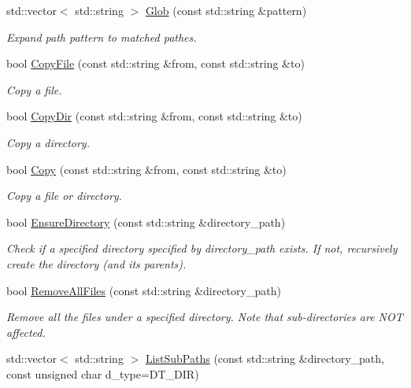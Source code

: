 \begin{DoxyCompactItemize}
std\-::vector$<$ std\-::string $>$ \hyperlink{namespaceapollo_1_1cyber_1_1common_a9641469fee4f575ee274054d5f3efd73}{Glob} (const std\-::string \&pattern)
\begin{DoxyCompactList}\small\item\em Expand path pattern to matched pathes. \end{DoxyCompactList}\item 
bool \hyperlink{namespaceapollo_1_1cyber_1_1common_a222bd281a29c75f00ed9e66a986ed674}{Copy\-File} (const std\-::string \&from, const std\-::string \&to)
\begin{DoxyCompactList}\small\item\em Copy a file. \end{DoxyCompactList}\item 
bool \hyperlink{namespaceapollo_1_1cyber_1_1common_a327d27353ef7e5d2f50c809c3b05648c}{Copy\-Dir} (const std\-::string \&from, const std\-::string \&to)
\begin{DoxyCompactList}\small\item\em Copy a directory. \end{DoxyCompactList}\item 
bool \hyperlink{namespaceapollo_1_1cyber_1_1common_a6eb038dc356389e7f1d1e6ab4932c4f0}{Copy} (const std\-::string \&from, const std\-::string \&to)
\begin{DoxyCompactList}\small\item\em Copy a file or directory. \end{DoxyCompactList}\item 
bool \hyperlink{namespaceapollo_1_1cyber_1_1common_ada31727aa6860a122a2f6876e84ae950}{Ensure\-Directory} (const std\-::string \&directory\-\_\-path)
\begin{DoxyCompactList}\small\item\em Check if a specified directory specified by directory\-\_\-path exists. If not, recursively create the directory (and its parents). \end{DoxyCompactList}\item 
bool \hyperlink{namespaceapollo_1_1cyber_1_1common_aa18872a33740ca001df7cf11bdf1d891}{Remove\-All\-Files} (const std\-::string \&directory\-\_\-path)
\begin{DoxyCompactList}\small\item\em Remove all the files under a specified directory. Note that sub-\/directories are N\-O\-T affected. \end{DoxyCompactList}\item 
std\-::vector$<$ std\-::string $>$ \hyperlink{namespaceapollo_1_1cyber_1_1common_a785184e21861f27284d8531610b550ae}{List\-Sub\-Paths} (const std\-::string \&directory\-\_\-path, const unsigned char d\-\_\-type=D\-T\-\_\-\-D\-I\-R)

\end{DoxyCompactItemize}
